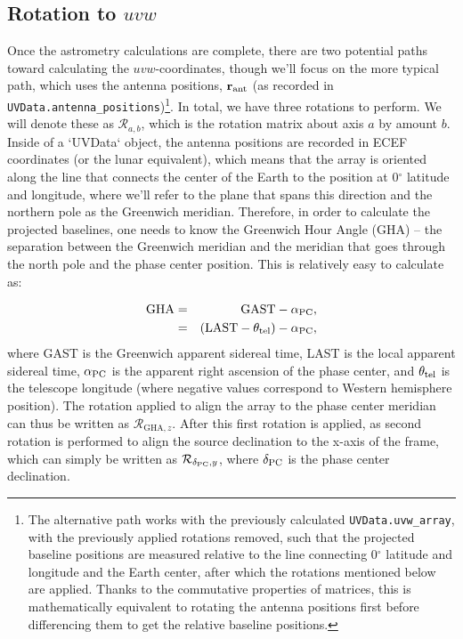 \documentclass[11pt, oneside]{article}
\begin{document}
\subsection{Rotation to $uvw$}\label{ssec:rotation}
Once the astrometry calculations are complete, there are two potential paths toward calculating the $uvw$-coordinates, though we'll focus on the more typical path, which uses the antenna positions, $\mathbf{r}_{\rm ant}$ (as recorded in \texttt{UVData.antenna\_positions})\footnote{The alternative path works with the previously calculated \texttt{UVData.uvw\_array}, with the previously applied rotations removed, such that the projected baseline positions are measured relative to the line connecting 0$^\circ$ latitude and longitude and the Earth center, after which the rotations mentioned below are applied. Thanks to the commutative properties of matrices, this is mathematically equivalent to rotating the antenna positions first before differencing them to get the relative baseline positions.}. In total, we have three rotations to perform. We will denote these as $\mathcal{R}_{a,b}$, which is the rotation matrix about axis $a$ by amount $b$. Inside of a `UVData` object, the antenna positions are recorded in ECEF coordinates (or the lunar equivalent), which means that the array is oriented along the line that connects the center of the Earth to the position at 0$^\circ$ latitude and longitude, where we'll refer to the plane that spans this direction and the northern pole as the Greenwich meridian. Therefore, in order to calculate the projected baselines, one needs to know the Greenwich Hour Angle (GHA) -- the separation between the Greenwich meridian and the meridian that goes through the north pole and the phase center position. This is relatively easy to calculate as:

\begin{eqnarray}
{\rm GHA} &=& {\rm GAST} - \alpha_{\rm PC}, \\
          &=& ({\rm LAST} - \theta_{\rm tel}) - \alpha_{\rm PC},
\end{eqnarray}
where GAST is the Greenwich apparent sidereal time, LAST is the local apparent sidereal time, $\alpha_{\rm PC}$ is the apparent right ascension of the phase center, and $\theta_{\rm tel}$ is the telescope longitude (where negative values correspond to Western hemisphere position). The rotation applied to align the array to the phase center meridian can thus be written as $\mathcal{R}_{\textrm{GHA}, z}$. After this first rotation is applied, as second rotation is performed to align the source declination to the x-axis of the frame, which can simply be written as $\mathcal{R}_{\delta_{\rm PC}, y}$, where $\delta_{\rm PC}$ is the phase center declination.
\end{document}
